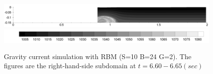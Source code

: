 \begin{figure}[htbp]
\begin{center}
\includegraphics[scale=0.35]{../figures/Exp3-CASE1-dt0.005/rec_2_buf_24_sub_10/D1-110.pdf}
    \includegraphics[scale=0.35]{../figures/Exp3-CASE1-dt0.005/legend.pdf}
    \caption{Gravity current simulation with RBM (S=10 B=24 G=2). The figures are the right-hand-side subdomain at $t=6.60-6.65(sec)$}
    \label{fig:RBM-GC-2Domain-R-S10-B24-G2-660}
  \end{center}
\end{figure}

\cp

